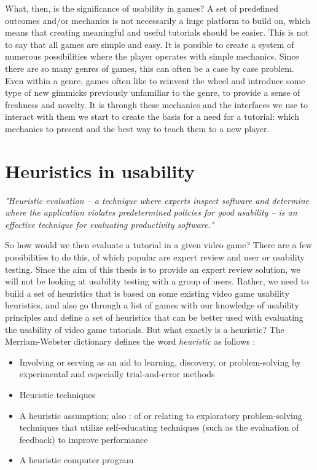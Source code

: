 What, then, is the significance of usability in games? A set of predefined outcomes and/or mechanics is not necessarily a huge platform to build on, which means that creating meaningful and useful tutorials should be easier. This is not to say that all games are simple and easy. It is possible to create a system of numerous possibilities where the player operates with simple mechanics. Since there are so many genres of games, this can often be a case by case problem. Even within a genre, games often like to reinvent the wheel and introduce some type of new gimmicks previously unfamiliar to the genre, to provide a sense of freshness and novelty. It is through these mechanics and the interfaces we use to interact with them we start to create the basis for a need for a tutorial: which mechanics to present and the best way to teach them to a new player.

\section{Heuristics in usability}

\begin{displayquote}
	\textit{"Heuristic evaluation – a technique where experts inspect software and determine where the application violates predetermined policies for good usability – is an effective technique for evaluating productivity software."} \cite{Livingston2010}
\end{displayquote}

So how would we then evaluate a tutorial in a given video game? There are a few possibilities to do this, of which popular are expert review and user or usability testing. Since the aim of this thesis is to provide an expert review solution, we will not be looking at usability testing with a group of users. Rather, we need to build a set of heuristics that is based on some existing video game usability heuristics, and also go through a list of games with our knowledge of usability principles and define a set of heuristics that can be better used with evaluating the usability of video game tutorials. But what exactly is a heuristic? The Merriam-Webster dictionary defines the word \textit{heuristic} as follows \cite{merriam2007}: 

\begin{itemize}
	\item Involving or serving as an aid to learning, discovery, or problem-solving by experimental and especially trial-and-error methods 
	\item Heuristic techniques 
	\item A heuristic assumption; also :  of or relating to exploratory problem-solving techniques that utilize self-educating techniques (such as the evaluation of feedback) to improve performance 
	\item A heuristic computer program 
	
\end{itemize}


